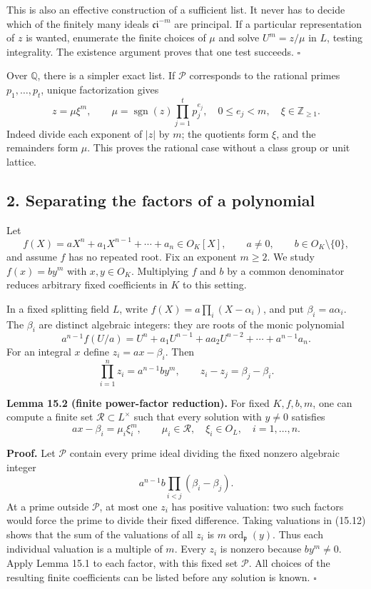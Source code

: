 \documentclass[
  11pt,
  a4paper,
]{article}
\begin{document}
This is also an effective construction of a sufficient list. It never
has to decide which of the finitely many ideals
\(\mathfrak c\mathfrak i^{-m}\) are principal. If a particular
representation of \(z\) is wanted, enumerate the finite choices of
\(\mu\) and solve \(U^m=z/\mu\) in \(L\), testing integrality. The
existence argument proves that one test succeeds. \(\square\)

Over \(\mathbb Q\), there is a simpler exact list. If \(\mathcal P\)
corresponds to the rational primes \(p_1,\ldots,p_t\), unique
factorization gives \[
z=\mu\xi^m,\qquad
\mu=\operatorname{sgn}(z)\prod_{j=1}^t p_j^{e_j},
\quad 0\le e_j<m,\quad \xi\in\mathbb Z_{\ge1}.
\tag{15.9}
\] Indeed divide each exponent of \(|z|\) by \(m\); the quotients form
\(\xi\), and the remainders form \(\mu\). This proves the rational case
without a class group or unit lattice.

\subsection{2. Separating the factors of a
polynomial}\label{separating-the-factors-of-a-polynomial}

Let \[
f(X)=aX^n+a_1X^{n-1}+\cdots+a_n\in O_K[X],
\qquad a\ne0,\qquad b\in O_K\setminus\{0\},
\tag{15.10}
\] and assume \(f\) has no repeated root. Fix an exponent \(m\ge2\). We
study \(f(x)=by^m\) with \(x,y\in O_K\). Multiplying \(f\) and \(b\) by
a common denominator reduces arbitrary fixed coefficients in \(K\) to
this setting.

In a fixed splitting field \(L\), write \(f(X)=a\prod_i(X-\alpha_i)\),
and put \(\beta_i=a\alpha_i\). The \(\beta_i\) are distinct algebraic
integers: they are roots of the monic polynomial \[
a^{n-1}f(U/a)
 =U^n+a_1U^{n-1}+aa_2U^{n-2}+\cdots+a^{n-1}a_n.
\tag{15.11}
\] For an integral \(x\) define \(z_i=ax-\beta_i\). Then \[
\prod_{i=1}^n z_i=a^{n-1}by^m,\qquad
z_i-z_j=\beta_j-\beta_i.
\tag{15.12}
\]

\textbf{Lemma 15.2 (finite power-factor reduction).} For fixed
\(K,f,b,m\), one can compute a finite set \(\mathcal R\subset L^\times\)
such that every solution with \(y\ne0\) satisfies \[
ax-\beta_i=\mu_i\xi_i^m,\qquad
\mu_i\in\mathcal R,\quad \xi_i\in O_L,\quad i=1,\ldots,n.
\tag{15.13}
\]

\textbf{Proof.} Let \(\mathcal P\) contain every prime ideal dividing
the fixed nonzero algebraic integer \[
a^{n-1}b\prod_{i<j}(\beta_i-\beta_j).
\tag{15.14}
\] At a prime outside \(\mathcal P\), at most one \(z_i\) has positive
valuation: two such factors would force the prime to divide their fixed
difference. Taking valuations in (15.12) shows that the sum of the
valuations of all \(z_i\) is \(m\operatorname{ord}_{\mathfrak p}(y)\).
Thus each individual valuation is a multiple of \(m\). Every \(z_i\) is
nonzero because \(b y^m\ne0\). Apply Lemma 15.1 to each factor, with
this fixed set \(\mathcal P\). All choices of the resulting finite
coefficients can be listed before any solution is known. \(\square\)
\end{document}
